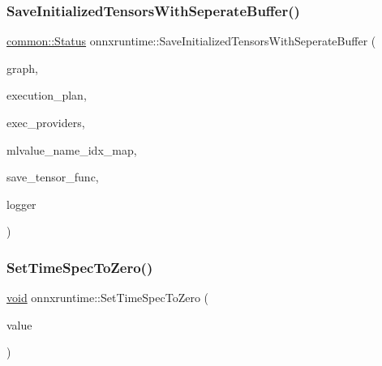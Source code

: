 \subsubsection{\texorpdfstring{Save\+Initialized\+Tensors\+With\+Seperate\+Buffer()}{SaveInitializedTensorsWithSeperateBuffer()}}
{\footnotesize\ttfamily \mbox{\hyperlink{classonnxruntime_1_1common_1_1Status}{common\+::\+Status}} onnxruntime\+::\+Save\+Initialized\+Tensors\+With\+Seperate\+Buffer (\begin{DoxyParamCaption}\item[{const \mbox{\hyperlink{classonnxruntime_1_1Graph}{onnxruntime\+::\+Graph}} \&}]{graph,  }\item[{const \mbox{\hyperlink{structonnxruntime_1_1SequentialExecutionPlan}{Sequential\+Execution\+Plan}} \&}]{execution\+\_\+plan,  }\item[{const \mbox{\hyperlink{classonnxruntime_1_1ExecutionProviders}{Execution\+Providers}} \&}]{exec\+\_\+providers,  }\item[{const \mbox{\hyperlink{classonnxruntime_1_1MLValueNameIdxMap}{M\+L\+Value\+Name\+Idx\+Map}} \&}]{mlvalue\+\_\+name\+\_\+idx\+\_\+map,  }\item[{const \mbox{\hyperlink{namespaceonnxruntime_a5fae67d87ce801a6093492d9af44a5bc}{Save\+Tensor\+Func}} \&}]{save\+\_\+tensor\+\_\+func,  }\item[{const \mbox{\hyperlink{classonnxruntime_1_1logging_1_1Logger}{logging\+::\+Logger}} \&}]{logger }\end{DoxyParamCaption})}

\mbox{\label{namespaceonnxruntime_a015e2b2dbc4e0719b03d1deee0aa6ff5}} 
\subsubsection{\texorpdfstring{Set\+Time\+Spec\+To\+Zero()}{SetTimeSpecToZero()}}
{\footnotesize\ttfamily \mbox{\hyperlink{mlasi_8h_a88f941d423cb2a819b70a1358982b1a6}{void}} onnxruntime\+::\+Set\+Time\+Spec\+To\+Zero (\begin{DoxyParamCaption}\item[{\mbox{\hyperlink{namespaceonnxruntime_ab69d87fbee3d0a327786f60db7c166e7}{T\+I\+M\+E\+\_\+\+S\+P\+EC}} $\ast$}]{value }\end{DoxyParamCaption})}

